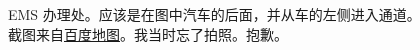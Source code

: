 \documentclass[oneside,final]{book}
\begin{document}
\begin{appendices}
\begin{figure}
  \caption[EMS 办理处]{EMS 办理处。应该是在图中汽车的后面，并从车的左侧进入通道。截图来自\href{https://map.baidu.com/\#panoid=09002200121707010635276742I\&panotype=street\&heading=274.99\&pitch=-2.29\&l=12\&tn=B_NORMAL_MAP\&sc=0\&newmap=1\&shareurl=1\&pid=09002200121707010635276742I}{百度地图}。我当时忘了拍照。抱歉。}
  \label{fig:EMS}
\end{figure}




















 

\end{appendices}

\listoftables
\listoffigures
\end{document}
